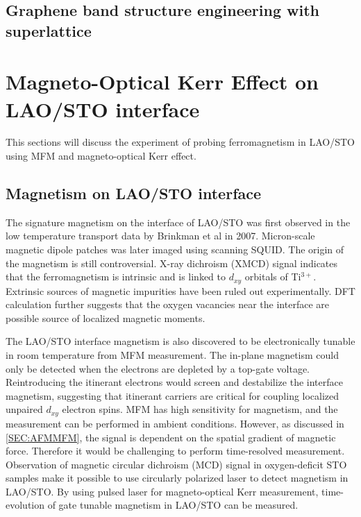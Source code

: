 \documentclass[pdflatex, sectionletters, 12pt]{pittetd}    %
\begin{document}
\section{Graphene band structure engineering with superlattice}

\chapter{Magneto-Optical Kerr Effect on LAO/STO interface}
\label{SEC:Kerr}

This sections will discuss the experiment of probing ferromagnetism in LAO/STO using MFM and magneto-optical Kerr effect. 

\section{Magnetism on LAO/STO interface}

The signature magnetism on the interface of LAO/STO was first observed in the low temperature transport data by Brinkman et al in 2007\cite{brinkman2007magnetic}. Micron-scale magnetic dipole patches was later imaged using scanning SQUID\cite{bert2011direct, kalisky2012scanning, kalisky2012critical}. The origin of the magnetism is still controversial. X-ray dichroism (XMCD) signal indicates that the ferromagnetism is intrinsic and is linked to $d_{xy}$ orbitals of Ti$^{3+}$\cite{lee2013titanium}. Extrinsic sources of magnetic impurities have been ruled out experimentally\cite{brinkman2007magnetic, lee2013titanium, ariando2011electronic}. DFT calculation further suggests that the oxygen vacancies near the interface are possible source of localized magnetic moments\cite{pentcheva2006charge}. 

The LAO/STO interface magnetism is also discovered to be electronically tunable in room temperature from MFM measurement\cite{bi2014room}. The in-plane magnetism could only be detected when the electrons are depleted by a top-gate voltage. Reintroducing the itinerant electrons would screen and destabilize the interface magnetism, suggesting that itinerant carriers are critical for coupling localized unpaired $d_{xy}$ electron spins\cite{fidkowski2013magnetic, Joshua2013gate, banerjee2013ferromagnetic}. MFM has high sensitivity for magnetism, and the measurement can be performed in ambient conditions. However, as discussed in \ref{SEC:AFMMFM}, the signal is dependent on the spatial gradient of magnetic force. Therefore it would be challenging to perform time-resolved measurement. Observation of magnetic circular dichroism (MCD) signal in oxygen-deficit STO samples\cite{rice2014persistent} make it possible to use circularly polarized laser to detect magnetism in LAO/STO. By using pulsed laser for magneto-optical Kerr measurement, time-evolution of gate tunable magnetism in LAO/STO can be measured. 
\end{document}
